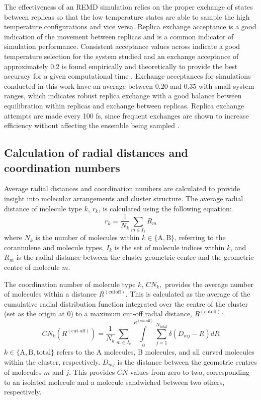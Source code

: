 The effectiveness of an REMD simulation relies on the proper exchange of states between replicas so that the low temperature states are able to sample the high temperature configurations and vice versa. Replica exchange acceptance is a good indication of the movement between replicas and is a common indicator of simulation performance. Consistent acceptance values across indicate a good temperature selection for the system studied and an exchange acceptance of approximately $0.2$ is found empirically and theoretically to provide the best accuracy for a given computational time \cite{Rathore2005,Kone}. Exchange acceptances for simulations conducted in this work have an average between $0.20$ and $0.35$ with small system ranges, which indicates robust replica exchange with a good balance between equilibration within replicas and exchange between replicas. Replica exchange attempts are made every 100 fs, since frequent exchanges are shown to increase efficiency without affecting the ensemble being sampled \cite{sindhikara2008exchange,sindhikara2010exchange}.

\subsection{Calculation of radial distances and coordination numbers}
\label{secSI:raddist_CN_eqns}
%
Average radial distances and coordination numbers are calculated to provide insight into molecular arrangements and cluster structure. The average radial distance of molecule type $k$, $r_{k}$, is calculated using the following equation:
\begin{equation}
    r_{k} = \frac{1}{N_{k}}\sum_{m \in I_{k}}R_{m}
\end{equation}
where $N_{k}$ is the number of molecules within $k \in \{\text{A},\text{B}\}$, referring to the corannulene and  molecule types, $I_{k}$ is the set of molecule indices within $k$, and $R_{m}$ is the radial distance between the cluster geometric centre and the geometric centre of molecule $m$.

The coordination number of molecule type $k$, $CN_{k},$ provides the average number of molecules within a distance $R^{(\text{cutoff})}$. This is calculated as the average of the cumulative radial distribution function integrated over the centre of the cluster (set as the origin at 0) to a maximum cut-off radial distance, $R^{(\text{cutoff})}$:
\begin{equation}
    CN_{k}(R^{(\text{cut-off})}) = \frac{1}{N_{k}} \sum_{m \in I_{k}} \int\limits_{0}^{R^{(\text{cut-off})}}  \sum_{j=1}^{N_{\text{total}}} \delta(D_{mj} - R) dR
\end{equation}
$k \in \{\text{A}, \text{B}, \text{total}\}$ refers to the A molecules, B molecules, and all curved molecules within the cluster, respectively. $D_{mj}$ is the distance between the geometric centres of molecules $m$ and $j$. 
This provides $CN$ values from zero to two, corresponding to an isolated molecule and a molecule sandwiched between two others, respectively.

